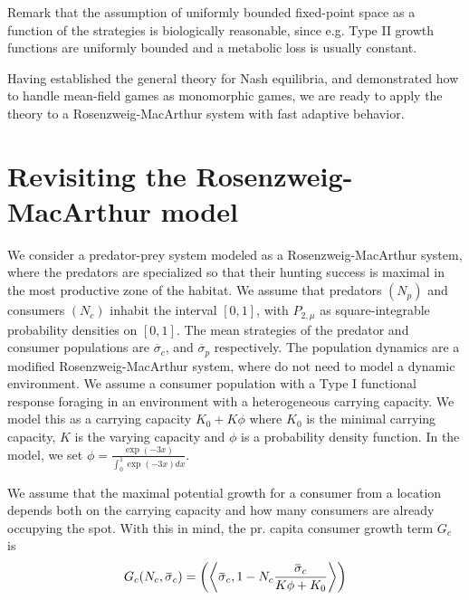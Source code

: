 Remark that the assumption of uniformly bounded fixed-point space as a function of the strategies is biologically reasonable, since e.g. Type II growth functions are uniformly bounded and a metabolic loss is usually constant.

Having established the general theory for Nash equilibria, and demonstrated how to handle mean-field games as monomorphic games, we are ready to apply the theory to a Rosenzweig-MacArthur system with fast adaptive behavior.
\section{Revisiting the Rosenzweig-MacArthur model}
\label{sec:model_rm}
We consider a predator-prey system modeled as a Rosenzweig-MacArthur system, where the predators are specialized so that their hunting success is maximal in the most productive zone of the habitat.
We assume that predators $(N_p)$ and consumers $(N_c)$ inhabit the interval $[0,1]$, with $P_{2,\mu}$ as square-integrable probability densities on $[0,1]$. The mean strategies of the predator and consumer populations are $\overbar{\sigma}_c$, and $\overbar{\sigma}_p$ respectively.
The population dynamics are a modified Rosenzweig-MacArthur system, where do not need to model a dynamic environment. We assume a consumer population with a Type I functional response foraging in an environment with a heterogeneous carrying capacity. We model this as a carrying capacity $K_0 + K \phi$ where $K_0$ is the minimal carrying capacity, $K$ is the varying capacity and $\phi$ is a probability density function. In the model, we set  $\phi = \frac{\exp(-3 x)}{\int_0^1 \exp(-3 x) dx}$.

We assume that the maximal potential growth for a consumer from a location depends both on the carrying capacity and how many consumers are already occupying the spot. With this in mind, the pr. capita consumer growth term $G_c$ is
\begin{equation}
  G_c(N_c, \overbar{\sigma}_c) = \pa{\ip{\overbar{\sigma}_c}{1-N_c \frac{\overbar{\sigma}_c}{K\phi + K_0}}}
\end{equation}



